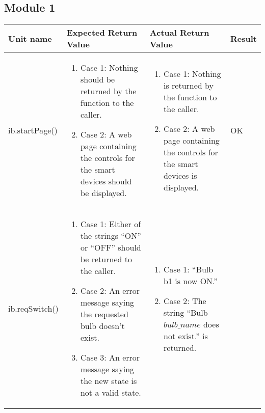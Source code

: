 \subsection{Module 1}
\begin{tabular}{|p{2.3cm}|p{5cm}|p{5cm}|p{1.2cm}|}
\hline
\textbf{Unit name} & \textbf{Expected Return Value} & \textbf{Actual Return Value} & \textbf{Result} \\
\hline
\vspace*{\baselineskip}ib.startPage() & \begin{enumerate}
\item[] \hspace*{-1cm}Case 1: Nothing should be returned by the function to the caller.
\item[] \hspace*{-1cm}Case 2: A web page containing the controls for the smart devices should be displayed.
\end{enumerate} & \begin{enumerate}
\item[] \hspace*{-1cm}Case 1: Nothing is returned by the function to the caller.
\item[] \hspace*{-1cm}Case 2: A web page containing the controls for the smart devices is displayed.
\end{enumerate} & \vspace*{\baselineskip}OK \\
\hline
\vspace*{\baselineskip}ib.reqSwitch() & \begin{enumerate}
\item[] \hspace*{-1cm}Case 1: Either of the strings ``ON'' or ``OFF'' should be returned to the caller.
\item[] \hspace*{-1cm}Case 2: An error message saying the requested bulb doesn't exist.
\item[] \hspace*{-1cm}Case 3: An error message saying the new state is not a valid state.
\end{enumerate} & \begin{enumerate}
\item[] \hspace*{-1cm}Case 1: ``Bulb b1 is now ON.''
\item[] \hspace*{-1cm}Case 2: The string ``Bulb $bulb\_name$ does not exist.'' is returned.

\end{enumerate}
\end{tabular}
